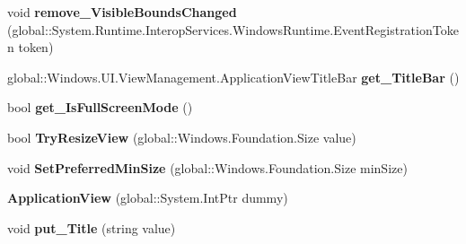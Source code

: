 \begin{DoxyCompactItemize}
\item 
\mbox{\label{class_windows_1_1_u_i_1_1_view_management_1_1_application_view_a3c9197225cd620a40c58179a49da3349}} 
void {\bfseries remove\+\_\+\+Visible\+Bounds\+Changed} (global\+::\+System.\+Runtime.\+Interop\+Services.\+Windows\+Runtime.\+Event\+Registration\+Token token)
\item 
\mbox{\label{class_windows_1_1_u_i_1_1_view_management_1_1_application_view_ab9b05a73da58fd42c06c39c87d3292d8}} 
global\+::\+Windows.\+U\+I.\+View\+Management.\+Application\+View\+Title\+Bar {\bfseries get\+\_\+\+Title\+Bar} ()
\item 
\mbox{\label{class_windows_1_1_u_i_1_1_view_management_1_1_application_view_afde1936ca2f8aded16b77720619151e5}} 
bool {\bfseries get\+\_\+\+Is\+Full\+Screen\+Mode} ()
\item 
\mbox{\label{class_windows_1_1_u_i_1_1_view_management_1_1_application_view_a239abe45572bb1478737b90836a4b386}} 
bool {\bfseries Try\+Resize\+View} (global\+::\+Windows.\+Foundation.\+Size value)
\item 
\mbox{\label{class_windows_1_1_u_i_1_1_view_management_1_1_application_view_a0578db6c17fe182700dc8c5cb8973a14}} 
void {\bfseries Set\+Preferred\+Min\+Size} (global\+::\+Windows.\+Foundation.\+Size min\+Size)
\item 
\mbox{\label{class_windows_1_1_u_i_1_1_view_management_1_1_application_view_a10e1e2089e594fe33f2e591fc465535c}} 
{\bfseries Application\+View} (global\+::\+System.\+Int\+Ptr dummy)
\item 
\mbox{\label{class_windows_1_1_u_i_1_1_view_management_1_1_application_view_ac9a73477b84f2c3e9e09660fdfe04e89}} 
void {\bfseries put\+\_\+\+Title} (string value)
\item 
\mbox{\label{class_windows_1_1_u_i_1_1_view_management_1_1_application_view_a08cf5cd5b2e28afa51bc13468334352a}} 

\end{DoxyCompactItemize}

